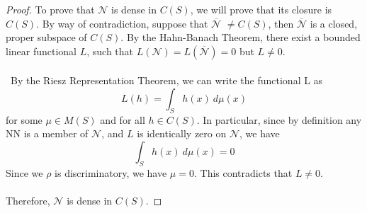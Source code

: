 \begin{proof}
To prove that $\mathcal{N}$ is dense in $C(S)$, we will prove that its closure is $C(S)$. By way of contradiction, suppose that $\overline{ \mathcal{N} }$ $\neq C(S)$, then  $\overline{ \mathcal{N} }$ is a closed, proper subspace of $C(S)$. By the Hahn-Banach Theorem, there exist a bounded linear functional $L$, such that $L(\mathcal{N})=L(\overline{ \mathcal{N} }) = 0 $ but $L \neq 0.$ \\ \\ By the Riesz Representation Theorem, we can write the functional L as 
\begin{equation*}
L(h) = \int_{S} h(x) \ d\mu(x)
\end{equation*}
for some $\mu \in M(S)$ and for all $h \in C(S).$ In particular, since by definition any NN is a member of $\mathcal{N}$, and $L$ is identically zero on $\mathcal{N}$, we have 
\begin{equation*}
\int_{S} h(x) \ d\mu(x) = 0
\end{equation*}
Since we $\rho$ is discriminatory, we have $\mu = 0$. This contradicts that $L \neq 0$. \\ \\ Therefore, $\mathcal{N}$ is dense in $C(S)$. 
\end{proof}
